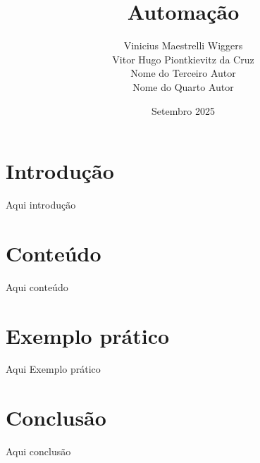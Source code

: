 \documentclass{article}
\title{Automação}
\author{%
	Vinicius Maestrelli Wiggers\\[0.5em]
	Vitor Hugo Piontkievitz da Cruz\\[0.5em]
	Nome do Terceiro Autor\\[0.5em]
	Nome do Quarto Autor
}
\date{Setembro 2025}
\begin{document}
\maketitle

\section{Introdução}
Aqui introdução

\section{Conteúdo}
Aqui conteúdo

\section{Exemplo prático}
Aqui Exemplo prático

\section{Conclusão}
Aqui conclusão
\end{document}
